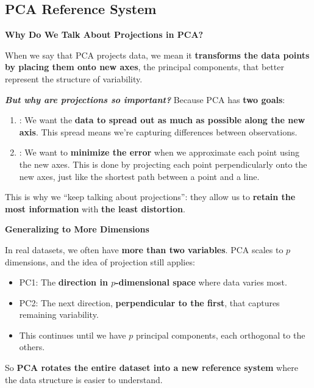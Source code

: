 \subsection{PCA Reference System}

\begin{flushleft}
    \textcolor{Green3}{ \textbf{Why Do We Talk About Projections in PCA?}}
\end{flushleft}
When we say that PCA projects data, we mean it \textbf{transforms the data points by placing them onto new axes}, the principal components, that better represent the structure of variability.

\highspace
\textcolor{Green3}{ \textbf{\emph{But why are projections so important?}}} Because PCA has \textbf{two goals}:
\begin{enumerate}
    \item {}: We want the \textbf{data to spread out as much as possible along the new axis}. This spread means we're capturing differences between observations.
    \item {}: We want to \textbf{minimize the error} when we approximate each point using the new axes. This is done by projecting each point perpendicularly onto the new axes, just like the shortest path between a point and a line.
\end{enumerate}
This is why we ``keep talking about projections'': they allow us to \textbf{retain the most information} with \textbf{the least distortion}.

\highspace
\begin{flushleft}
    \textcolor{Green3}{ \textbf{Generalizing to More Dimensions}}
\end{flushleft}
In real datasets, we often have \textbf{more than two variables}. PCA scales to $p$ dimensions, and the idea of projection still applies:
\begin{itemize}
    \item PC1: The \textbf{direction in $p$-dimensional space} where data varies most.
    \item PC2: The next direction, \textbf{perpendicular to the first}, that captures remaining variability.
    \item This continues until we have $p$ principal components, each orthogonal to the others.
\end{itemize}
So \textbf{PCA rotates the entire dataset into a new reference system} where the data structure is easier to understand.


